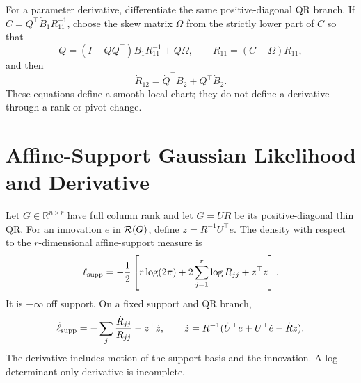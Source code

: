 For a parameter derivative, differentiate the same positive-diagonal QR
branch.  If \(C=Q^\top\dot B_1R_{11}^{-1}\), choose the skew matrix
\(\Omega\) from the strictly lower part of \(C\) so that
\begin{equation}
\label{eq:bf-rectangular-fixed-chart-derivative}
  \dot Q=(I-QQ^\top)\dot B_1R_{11}^{-1}+Q\Omega,
  \qquad
  \dot R_{11}=(C-\Omega)R_{11},
\end{equation}
and then
\[
  \dot R_{12}=\dot Q^\top B_2+Q^\top\dot B_2.
\]
These equations define a smooth local chart; they do not define a derivative
through a rank or pivot change.

\section{Affine-Support Gaussian Likelihood and Derivative}
\label{sec:bf-affine-support-likelihood}

Let \(G\in\mathbb R^{n\times r}\) have full column rank and let
\(G=UR\) be its positive-diagonal thin QR.  For an innovation \(e\) in
\({\cal R}(G)\), define \(z=R^{-1}U^\top e\).  The density with respect to
the \(r\)-dimensional affine-support measure is
\begin{equation}
\label{eq:bf-affine-support-log-density}
 \ell_{\rm supp}
 =-\frac12\left[r\log(2\pi)+2\sum_{j=1}^r\log R_{jj}+z^\top z\right].
\end{equation}
It is \(-\infty\) off support.  On a fixed support and QR branch,
\begin{equation}
\label{eq:bf-affine-support-score}
 \dot\ell_{\rm supp}
 =-\sum_j\frac{\dot R_{jj}}{R_{jj}}-z^\top\dot z,
 \qquad
 \dot z=R^{-1}(\dot U^\top e+U^\top\dot e-\dot Rz).
\end{equation}
The derivative includes motion of the support basis and the innovation.  A
log-determinant-only derivative is incomplete.

